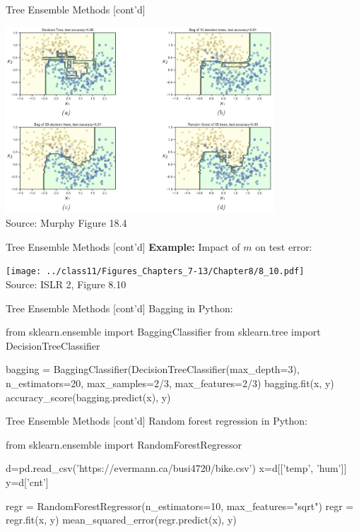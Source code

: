 \documentclass[ignorenonframetext,xcolor=x11names]{beamer}
\begin{document}
\begin{frame}{Tree Ensemble Methods \small [cont'd]}
\centering

\includegraphics[height=2.75in]{murphy_18_04.png} \\

\scriptsize Source: Murphy Figure 18.4 \normalsize
\end{frame}

\begin{frame}{Tree Ensemble Methods \small [cont'd]}
\textbf{Example:} Impact of $m$ on test error:

\centering

\texttt{[image: ../class11/Figures\_Chapters\_7-13/Chapter8/8\_10.pdf]} \\

\scriptsize Source: ISLR 2, Figure 8.10 \normalsize
\end{frame}

\begin{frame}[fragile]{Tree Ensemble Methods \small [cont'd]}
Bagging in Python:
\begin{pythoncode}
from sklearn.ensemble import BaggingClassifier
from sklearn.tree import DecisionTreeClassifier

bagging = BaggingClassifier(DecisionTreeClassifier(max_depth=3),
    n_estimators=20,
    max_samples=2/3, 
    max_features=2/3)
bagging.fit(x, y)
accuracy_score(bagging.predict(x), y)
\end{pythoncode}
\end{frame}

\begin{frame}[fragile]{Tree Ensemble Methods \small [cont'd]}
Random forest regression in Python:

\begin{pythoncode}
from sklearn.ensemble import RandomForestRegressor

d=pd.read_csv('https://evermann.ca/busi4720/bike.csv')
x=d[['temp', 'hum']]
y=d['cnt']
\end{pythoncode}

\begin{pythoncode}
regr = RandomForestRegressor(n_estimators=10, 
                             max_features="sqrt")
regr = regr.fit(x, y)
mean_squared_error(regr.predict(x), y)
\end{pythoncode}
\end{frame}
\end{document}
